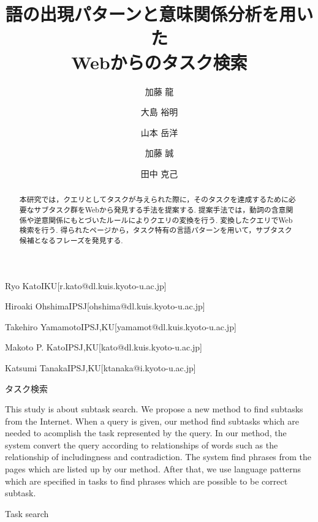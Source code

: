 \documentclass[submit,techreq]{ipsj}
\begin{document}
\title{語の出現パターンと意味関係分析を用いた\\
Webからのタスク検索}







\author{加藤 龍}{Ryo Kato}{IKU}[r.kato@dl.kuis.kyoto-u.ac.jp]
\author{大島 裕明}{Hiroaki Ohshima}{IPSJ}[ohshima@dl.kuis.kyoto-u.ac.jp]
\author{山本 岳洋}{Takehiro Yamamoto}{IPSJ,KU}[yamamot@dl.kuis.kyoto-u.ac.jp]
\author{加藤 誠}{Makoto P. Kato}{IPSJ,KU}[kato@dl.kuis.kyoto-u.ac.jp]
\author{田中 克己}{Katsumi Tanaka}{IPSJ,KU}[ktanaka@i.kyoto-u.ac.jp]

\begin{abstract}
本研究では，クエリとしてタスクが与えられた際に，そのタスクを達成するために必要なサブタスク群をWebから発見する手法を提案する. 提案手法では，動詞の含意関係や逆意関係にもとづいたルールによりクエリの変換を行う. 変換したクエリでWeb検索を行う. 得られたページから，タスク特有の言語パターンを用いて，サブタスク候補となるフレーズを発見する. 
\end{abstract}

\begin{jkeyword}
タスク検索
\end{jkeyword}

\begin{eabstract}
This study is about subtask search. We propose a new method to find subtasks from the Internet. When a query is given, our method find subtasks which are needed to acomplish the task represented by the query. In our method, the system convert the query according to relationships of words such as the relationship of includingness and contradiction. The system find phrases from the pages which are listed up by our method. After that, we use language patterns which are specified in tasks to find phrases which are possible to be correct subtask.
\end{eabstract}

\begin{ekeyword}
Task search
\end{ekeyword}

\maketitle
\end{document}
